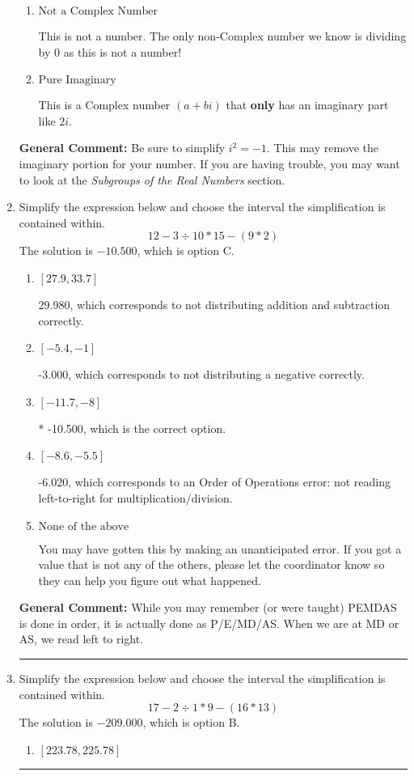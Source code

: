 \documentclass{extbook}[14pt]
\newcommand{\litem}[1]{\item #1

\rule{\textwidth}{0.4pt}}
\begin{document}
\begin{enumerate}
{\begin{enumerate}[label=\Alph*.]
These cannot be written as a fraction of Integers. Remember: $\pi$ is not an Integer!
\item \( \text{Not a Complex Number} \)

This is not a number. The only non-Complex number we know is dividing by 0 as this is not a number!
\item \( \text{Pure Imaginary} \)

This is a Complex number $(a+bi)$ that \textbf{only} has an imaginary part like $2i$.
\end{enumerate}

\textbf{General Comment:} Be sure to simplify $i^2 = -1$. This may remove the imaginary portion for your number. If you are having trouble, you may want to look at the \textit{Subgroups of the Real Numbers} section.
}
\litem{
Simplify the expression below and choose the interval the simplification is contained within.
\[ 12 - 3 \div 10 * 15 - (9 * 2) \]The solution is \( -10.500 \), which is option C.\begin{enumerate}[label=\Alph*.]
\item \( [27.9, 33.7] \)

 29.980, which corresponds to not distributing addition and subtraction correctly.
\item \( [-5.4, -1] \)

 -3.000, which corresponds to not distributing a negative correctly.
\item \( [-11.7, -8] \)

* -10.500, which is the correct option.
\item \( [-8.6, -5.5] \)

 -6.020, which corresponds to an Order of Operations error: not reading left-to-right for multiplication/division.
\item \( \text{None of the above} \)

 You may have gotten this by making an unanticipated error. If you got a value that is not any of the others, please let the coordinator know so they can help you figure out what happened.
\end{enumerate}

\textbf{General Comment:} While you may remember (or were taught) PEMDAS is done in order, it is actually done as P/E/MD/AS. When we are at MD or AS, we read left to right.
}
\litem{
Simplify the expression below and choose the interval the simplification is contained within.
\[ 17 - 2 \div 1 * 9 - (16 * 13) \]The solution is \( -209.000 \), which is option B.\begin{enumerate}[label=\Alph*.]
\item \( [223.78, 225.78] \)


\end{enumerate}}
\end{enumerate}
\end{document}
